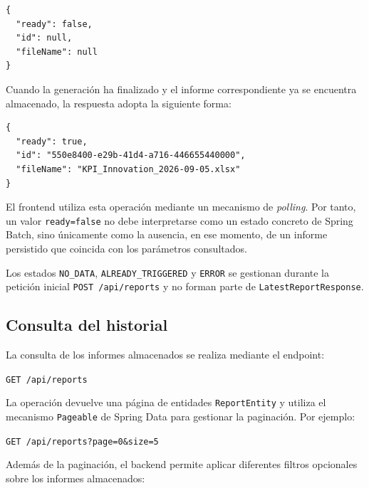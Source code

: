 \documentclass[11pt,a4paper,titlepage,oneside]{report}
\begin{document}
\begin{lstlisting}[caption={Respuesta de seguimiento mientras el informe no está disponible}]
{
  "ready": false,
  "id": null,
  "fileName": null
}
\end{lstlisting}

Cuando la generación ha finalizado y el informe correspondiente ya se
encuentra almacenado, la respuesta adopta la siguiente forma:

\begin{lstlisting}[caption={Respuesta de seguimiento cuando el informe está disponible}]
{
  "ready": true,
  "id": "550e8400-e29b-41d4-a716-446655440000",
  "fileName": "KPI_Innovation_2026-09-05.xlsx"
}
\end{lstlisting}

El frontend utiliza esta operación mediante un mecanismo de
\textit{polling}. Por tanto, un valor \texttt{ready=false} no debe
interpretarse como un estado concreto de Spring Batch, sino únicamente como
la ausencia, en ese momento, de un informe persistido que coincida con los
parámetros consultados.

Los estados \texttt{NO\_DATA}, \texttt{ALREADY\_TRIGGERED} y
\texttt{ERROR} se gestionan durante la petición inicial
\texttt{POST /api/reports} y no forman parte de
\texttt{LatestReportResponse}.

\subsection{Consulta del historial}

La consulta de los informes almacenados se realiza mediante el endpoint:

\begin{center}
\texttt{GET /api/reports}
\end{center}

La operación devuelve una página de entidades \texttt{ReportEntity} y utiliza
el mecanismo \texttt{Pageable} de Spring Data para gestionar la paginación.
Por ejemplo:

\begin{center}
\texttt{GET /api/reports?page=0\&size=5}
\end{center}

Además de la paginación, el backend permite aplicar diferentes filtros
opcionales sobre los informes almacenados:
\end{document}

